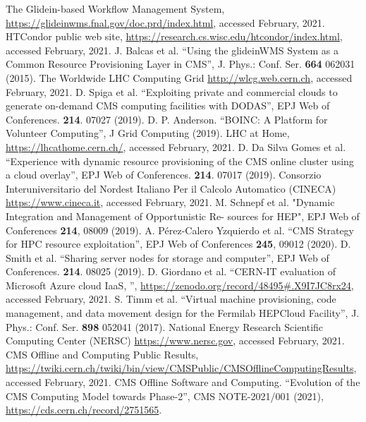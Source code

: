 \documentclass{webofc}
\begin{document}
\begin{thebibliography}{}

 The Glidein-based Workflow Management System, \url{https://glideinwms.fnal.gov/doc.prd/index.html}, accessed February, 2021.
 HTCondor public web site, \url{https://research.cs.wisc.edu/htcondor/index.html}, accessed February, 2021.
 J. Balcas et al. ``Using the glideinWMS System as a Common Resource Provisioning Layer in CMS'', J. Phys.: Conf. Ser. \textbf{664} 062031 (2015).
 The Worldwide LHC Computing Grid \url{http://wlcg.web.cern.ch}, accessed February, 2021. 
 D. Spiga et al. ``Exploiting private and commercial clouds to generate on-demand CMS computing facilities with DODAS'', EPJ Web of Conferences. \textbf{214}. 07027 (2019). 
 D. P. Anderson. ``BOINC: A Platform for Volunteer Computing'', J Grid Computing (2019). 
 LHC at Home, \url{https://lhcathome.cern.ch/}, accessed February, 2021.
 D. Da Silva Gomes et al. ``Experience with dynamic resource provisioning of the CMS online cluster using a cloud overlay'', EPJ Web of Conferences. \textbf{214}. 07017 (2019).
 Consorzio Interuniversitario del Nordest Italiano Per il Calcolo Automatico (CINECA) \url{https://www.cineca.it}, accessed February, 2021.
 M. Schnepf et al. "Dynamic Integration and Management of Opportunistic Re- sources for HEP", EPJ Web of Conferences \textbf{214}, 08009 (2019).
 A. P\'erez-Calero Yzquierdo et al. ``CMS Strategy for HPC resource exploitation'', EPJ Web of Conferences \textbf{245}, 09012 (2020).
 D. Smith et al. ``Sharing server nodes for storage and computer'', EPJ Web of Conferences. \textbf{214}. 08025 (2019).
 D. Giordano et al. ``CERN-IT evaluation of Microsoft Azure cloud IaaS, '', \url{https://zenodo.org/record/48495#.X9I7JC8rx24}, accessed February, 2021.
 S. Timm et al. ``Virtual machine provisioning, code management, and data movement design for the Fermilab HEPCloud Facility'', J. Phys.: Conf. Ser. \textbf{898} 052041 (2017).
 National Energy Research Scientific Computing Center (NERSC) \url{https://www.nersc.gov}, accessed February, 2021.
 CMS Offline and Computing Public Results, \url{https://twiki.cern.ch/twiki/bin/view/CMSPublic/CMSOfflineComputingResults}, accessed February, 2021.
 CMS Offline Software and Computing. ``Evolution of the CMS Computing Model towards Phase-2'', CMS NOTE-2021/001 (2021), \url{https://cds.cern.ch/record/2751565}.

\end{thebibliography}
\end{document}
